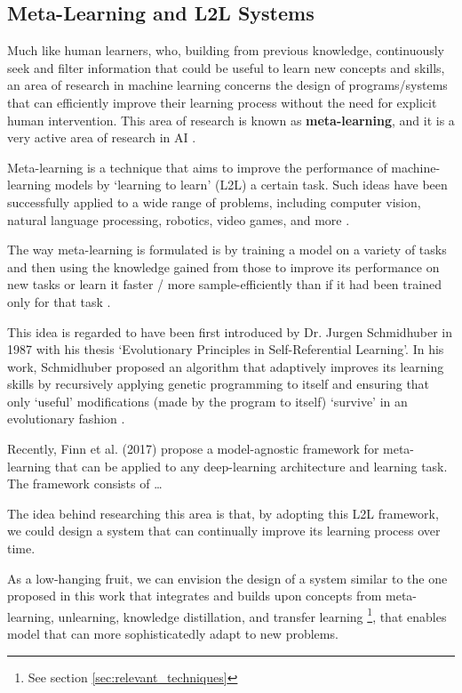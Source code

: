 \documentclass[../main.tex]{subfiles}
\begin{document}
    \subsection{Meta-Learning and L2L Systems} \label{conclusions:research_directions:l2l} 

    Much like human learners, who, building from previous knowledge, continuously seek and filter information that could be useful to learn new concepts and skills, an area of research in machine learning concerns the design of programs/systems that can efficiently improve their learning process without the need for explicit human intervention. This area of research is known as \textbf{meta-learning}, and it is a very active area of research in AI .
    
    Meta-learning is a technique that aims to improve the performance of machine-learning models by `learning to learn' (L2L) a certain task. Such ideas have been successfully applied to a wide range of problems, including computer vision, natural language processing, robotics, video games, and more \cite{hospedales_meta-learning_2020}.
    
    The way meta-learning is formulated is by training a model on a variety of tasks and then using the knowledge gained from those to improve its performance on new tasks or learn it faster / more sample-efficiently than if it had been trained only for that task \cite{hospedales_meta-learning_2020}.
    
    This idea is regarded to have been first introduced by Dr. Jurgen Schmidhuber in 1987 with his thesis `Evolutionary Principles in Self-Referential Learning'. In his work, Schmidhuber proposed an algorithm that adaptively improves its learning skills by recursively applying genetic programming to itself and ensuring that only `useful' modifications (made by the program to itself) `survive' in an evolutionary fashion \cite{schmidhuber_evolutionary_1987}.
    
    Recently, Finn et al. (2017) \cite{finn_model-agnostic_2017} propose a model-agnostic framework for meta-learning that can be applied to any deep-learning architecture and learning task. The framework consists of \dots

    The idea behind researching this area is that, by adopting this L2L framework, we could design a system that can continually improve its learning process over time.

    As a low-hanging fruit, we can envision the design of a system similar to the one proposed in this work that integrates and builds upon concepts from meta-learning, unlearning, knowledge distillation, and transfer learning \footnote{See section \ref{sec:relevant_techniques}}, that enables model that can more sophisticatedly adapt to new problems. 
    
\end{document}
